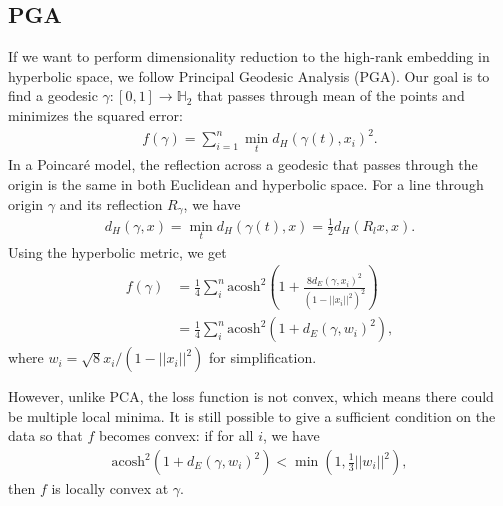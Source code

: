 \subsection{PGA}
If we want to perform dimensionality reduction to the high-rank embedding in hyperbolic space, we follow Principal Geodesic Analysis (PGA). Our goal is to find a geodesic $\gamma: [0, 1] \rightarrow \mathbb{H}_2$ that passes through mean of the points and minimizes the squared error:
\begin{align*}
    f(\gamma) = \sum^n_{i=1} \min_t d_H(\gamma(t), x_i)^2. 
\end{align*}
In a Poincar\'e model, the reflection across a geodesic that passes through the origin is the same in both Euclidean and hyperbolic space. For a line through origin $\gamma$ and its reflection $R_\gamma$, we have
\begin{align*}
    d_H(\gamma, x) = \min_t d_H(\gamma(t), x) = \frac{1}{2}d_H(R_l x, x).
\end{align*}
Using the hyperbolic metric, we get 
\begin{align*}
    f(\gamma) &= \frac{1}{4}\sum^n_i \text{acosh}^2(1 + \frac{8d_E(\gamma, x_i)^2}{(1 - ||x_i||^2)^2})\\
    &= \frac{1}{4}\sum^n_i \text{acosh}^2(1 + d_E(\gamma, w_i)^2),
\end{align*}
where $w_i = \sqrt{8}x_i/(1 - ||x_i||^2)$ for simplification. 

However, unlike PCA, the loss function is not convex, which means there could be multiple local minima. It is still possible to give a sufficient condition on the data so that $f$ becomes convex: if for all $i$, we have 
\begin{align*}
    \text{acosh}^2(1 + d_E(\gamma, w_i)^2) < \min(1, \frac{1}{3}||w_i||^2),
\end{align*}
then $f$ is locally convex at $\gamma$. 

